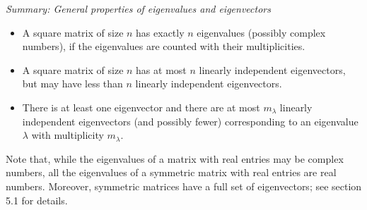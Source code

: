 \par\medskip\noindent\textit{Summary: General properties of eigenvalues and
eigenvectors}\par\medskip

\begin{itemize}
\item A square matrix of size $n$ has exactly $n$ eigenvalues (possibly complex
numbers), if the eigenvalues are counted with their multiplicities.

\item A square matrix of size $n$ has at most $n$ linearly independent eigenvectors,
but may have less than $n$ linearly independent eigenvectors.

\item There is at least one eigenvector and there are at most $m_\lambda$ linearly
independent eigenvectors (and possibly fewer) corresponding to an eigenvalue $\lambda$
with multiplicity $m_\lambda$.
\end{itemize}

Note that, while the eigenvalues of a matrix with real entries may be complex numbers,
all the eigenvalues of a symmetric matrix with real entries are real numbers.
Moreover, symmetric matrices have a full set of eigenvectors; see section 5.1 for
details.
